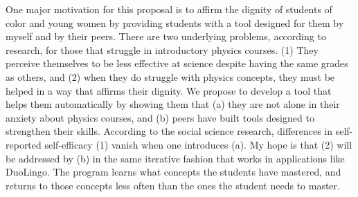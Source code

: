 \documentclass[../../../main.tex]{subfiles}
\begin{document}
One major motivation for this proposal is to affirm the dignity of students of color and young women by providing students with a tool designed for them by myself and by their peers. There are two underlying problems, according to research, for those that struggle in introductory physics courses. (1) They perceive themselves to be less effective at science despite having the same grades as others, and (2) when they do struggle with physics concepts, they must be helped in a way that affirms their dignity. We propose to develop a tool that helps them automatically by showing them that (a) they are not alone in their anxiety about physics courses, and (b) peers have built tools designed to strengthen their skills. According to the social science research, differences in self-reported self-efficacy (1) vanish when one introduces (a).  My hope is that (2) will be addressed by (b) in the same iterative fashion that works in applications like DuoLingo.  The program learns what concepts the students have mastered, and returns to those concepts less often than the ones the student needs to master.
\end{document}
